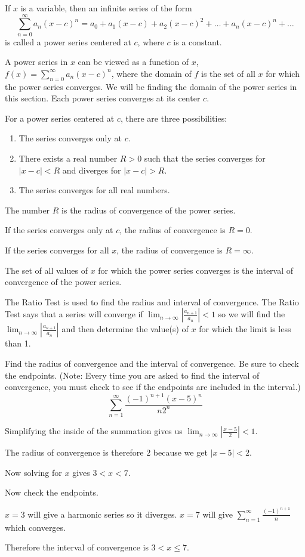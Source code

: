 \documentclass[../bccalc.tex]{subfiles}
\begin{document}
\begin{definition}
    If $x$ is a variable, then an infinite series of the form 
    \[ \sum_{n=0}^{\infty}a_n(x-c)^n = a_0+a_1(x-c)+a_2(x-c)^2+\dots+a_n(x-c)^n + \dots \]
    is called a power series centered at $c$, where $c$ is a constant.
\end{definition}

A power series in $x$ can be viewed as a function of $x$, $f(x)=\sum_{n=0}^{\infty}a_n (x-c)^n$, where the domain of $f$ is the set of all $x$ for which the power series converges. We will be finding the domain of the power series in this section. Each power series converges at its center $c$.

For a power series centered at $c$, there are three possibilities:
\begin{enumerate}
    \item The series converges only at $c$.
    \item There exists a real number $R>0$ such that the series converges for $|x-c|<R$ and diverges for $|x-c|>R$.
    \item The series converges for all real numbers.
\end{enumerate}

The number $R$ is the radius of convergence of the power series.

If the series converges only at $c$, the radius of convergence is $R=0$.

If the series converges for all $x$, the radius of convergence is $R=\infty$.

The set of all values of $x$ for which the power series converges is the interval of convergence of the power series.

The Ratio Test is used to find the radius and interval of convergence. The Ratio Test says that a series will converge if $\lim_{n\to\infty}\left|\frac{a_{n+1}}{a_n}\right|<1$ so we will find the $\lim_{n\to\infty}\left|\frac{a_{n+1}}{a_n}\right|$ and then determine the value(s) of $x$ for which the limit is less than 1.

\pagebreak
\begin{example}
    Find the radius of convergence and the interval of convergence. Be sure to check the endpoints. (Note: Every time you are asked to find the interval of convergence, you must check to see if the endpoints are included in the interval.)
    \[ \sum_{n=1}^{\infty} \frac{(-1)^{n+1}(x-5)^n}{n2^n} \]

    Simplifying the inside of the summation gives us $\lim_{n\to\infty} \left| \frac{x-5}{2}\right|<1$.

    The radius of convergence is therefore $2$ because we get $|x-5|<2$.

    Now solving for $x$ gives $3<x<7$.

    Now check the endpoints.

    $x=3$ will give a harmonic series so it diverges. $x=7$ will give $\sum_{n=1}^{\infty}\frac{(-1)^{n+1}}{n}$ which converges.

    Therefore the interval of convergence is $3<x\leq 7$.
\end{example}
\end{document}
